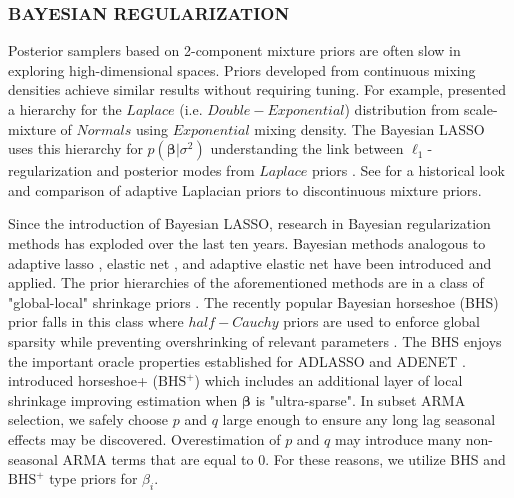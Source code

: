 \subsubsection{BAYESIAN REGULARIZATION}
Posterior samplers based on 2-component mixture priors are often slow in exploring high-dimensional spaces. Priors developed from continuous mixing densities achieve similar results without requiring tuning. For example, \cite{Andrews1974} presented a hierarchy for the $Laplace$ (i.e. $Double-Exponential$) distribution from scale-mixture of $Normals$ using $Exponential$ mixing density. The Bayesian LASSO \citep{Park2008,Hans2009} uses this hierarchy for $p(\bm{\beta}|\sigma^2)$ understanding the link between $\ell_1$-regularization and posterior modes from $Laplace$ priors \citep{Tibshirani1996}. See \cite{OHara2009} for a historical look and comparison of adaptive Laplacian priors to discontinuous mixture priors.

Since the introduction of Bayesian LASSO, research in Bayesian regularization methods has exploded over the last ten years. Bayesian methods analogous to adaptive lasso \citep{Leng2014}, elastic net \citep{Li2010a}, and adaptive elastic net \citep{Stankiewicz2015} have been introduced and applied. The prior hierarchies of the aforementioned methods are in a class of "global-local" shrinkage priors \citep{Polson2010}. The recently popular Bayesian horseshoe (BHS) prior falls in this class where $half-Cauchy$ priors are used to enforce global sparsity while preventing overshrinking of relevant parameters \citep{Carvalho2009,Carvalho2010}. The BHS enjoys the important oracle properties established for ADLASSO and ADENET \citep{Datta2015}. \cite{Bhadra2016} introduced horseshoe+ ($\textrm{BHS}^+$) which includes an additional layer of local shrinkage improving estimation when $\bm{\beta}$ is "ultra-sparse". In subset ARMA selection, we safely choose $p$ and $q$ large enough to ensure any long lag seasonal effects may be discovered. Overestimation of $p$ and $q$ may introduce many non-seasonal ARMA terms that are equal to 0.  For these reasons, we utilize BHS and $\textrm{BHS}^+$ type priors for $\beta_i$. 


